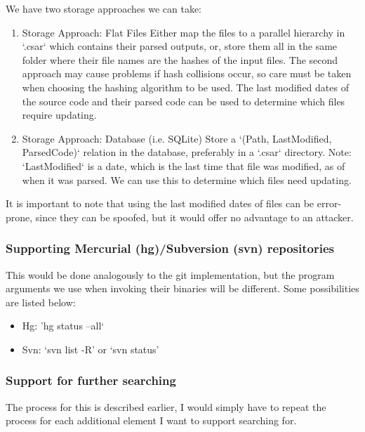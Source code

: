 \documentclass[12pt, letterpaper]{article}
\begin{document}
We have two storage approaches we can take:
\begin{enumerate}
    \item Storage Approach: Flat Files\newline
    Either map the files to a parallel hierarchy in `.csar` which contains their parsed outputs, or, store them all in the same folder where their file names are the hashes of the input files.
    The second approach may cause problems if hash collisions occur, so care must be taken when choosing the hashing algorithm to be used.
    The last modified dates of the source code and their parsed code can be used to determine which files require updating.
    \item Storage Approach: Database (i.e. SQLite)\newline
    Store a `(Path, LastModified, ParsedCode)` relation in the database, preferably in a `.csar` directory.
    Note: `LastModified` is a date, which is the last time that file was modified, as of when it was parsed.
    We can use this to determine which files need updating.
\end{enumerate}

It is important to note that using the last modified dates of files can be error-prone, since they can be spoofed, but it would offer no advantage to an attacker.

\subsubsection{Supporting Mercurial (hg)/Subversion (svn) repositories}
This would be done analogously to the git implementation, but the program arguments we use when invoking their binaries will be different.
Some possibilities are listed below:
\begin{itemize}
    \item Hg: 'hg status --all`
    \item Svn: `svn list -R' or `svn status'
\end{itemize}

\subsubsection{Support for further searching}
The process for this is described earlier, I would simply have to repeat the process for each additional element I want to support searching for.
\end{document}
